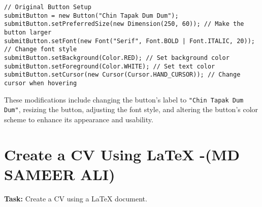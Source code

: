 \documentclass[a4paper,15pt]{article}
\begin{document}
\begin{itemize}[leftmargin=1.5cm]
\begin{verbatim}
// Original Button Setup
submitButton = new Button("Chin Tapak Dum Dum");
submitButton.setPreferredSize(new Dimension(250, 60)); // Make the button larger
submitButton.setFont(new Font("Serif", Font.BOLD | Font.ITALIC, 20)); // Change font style
submitButton.setBackground(Color.RED); // Set background color
submitButton.setForeground(Color.WHITE); // Set text color
submitButton.setCursor(new Cursor(Cursor.HAND_CURSOR)); // Change cursor when hovering
\end{verbatim}

These modifications include changing the button's label to \texttt{"Chin Tapak Dum Dum"}, resizing the button, adjusting the font style, and altering the button's color scheme to enhance its appearance and usability.

 \end{itemize}

 \newpage

\section{Create a CV Using LaTeX -(MD SAMEER ALI)}

\textbf{Task:} Create a CV using a LaTeX document.
\end{document}

